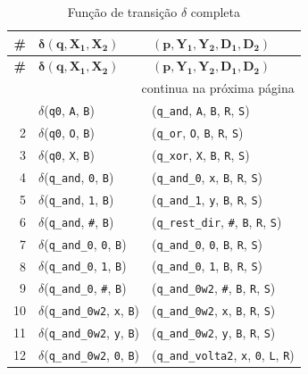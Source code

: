 \documentclass[report, 12pt]{uftreport}
\begin{document}
{\small
\begin{longtable}{r l l}
\caption{Função de transição $\delta$ completa}\label{tab:delta}\\
\toprule
\textbf{\#} & $\boldsymbol{\delta(q, X_1, X_2)}$ & $\boldsymbol{(p, Y_1, Y_2, D_1, D_2)}$ \\
\midrule
\endfirsthead
\toprule
\textbf{\#} & $\boldsymbol{\delta(q, X_1, X_2)}$ & $\boldsymbol{(p, Y_1, Y_2, D_1, D_2)}$ \\
\midrule
\endhead
\midrule
\multicolumn{3}{r}{\footnotesize continua na próxima página}\\
\endfoot
\bottomrule
\endlastfoot
1 & $\delta$(\texttt{q0}, \texttt{A}, \texttt{B}) & (\texttt{q\_and}, \texttt{A}, \texttt{B}, \texttt{R}, \texttt{S}) \\
2 & $\delta$(\texttt{q0}, \texttt{O}, \texttt{B}) & (\texttt{q\_or}, \texttt{O}, \texttt{B}, \texttt{R}, \texttt{S}) \\
3 & $\delta$(\texttt{q0}, \texttt{X}, \texttt{B}) & (\texttt{q\_xor}, \texttt{X}, \texttt{B}, \texttt{R}, \texttt{S}) \\
\midrule
4 & $\delta$(\texttt{q\_and}, \texttt{0}, \texttt{B}) & (\texttt{q\_and\_0}, \texttt{x}, \texttt{B}, \texttt{R}, \texttt{S}) \\
5 & $\delta$(\texttt{q\_and}, \texttt{1}, \texttt{B}) & (\texttt{q\_and\_1}, \texttt{y}, \texttt{B}, \texttt{R}, \texttt{S}) \\
6 & $\delta$(\texttt{q\_and}, \texttt{\#}, \texttt{B}) & (\texttt{q\_rest\_dir}, \texttt{\#}, \texttt{B}, \texttt{R}, \texttt{S}) \\
\midrule
7 & $\delta$(\texttt{q\_and\_0}, \texttt{0}, \texttt{B}) & (\texttt{q\_and\_0}, \texttt{0}, \texttt{B}, \texttt{R}, \texttt{S}) \\
8 & $\delta$(\texttt{q\_and\_0}, \texttt{1}, \texttt{B}) & (\texttt{q\_and\_0}, \texttt{1}, \texttt{B}, \texttt{R}, \texttt{S}) \\
9 & $\delta$(\texttt{q\_and\_0}, \texttt{\#}, \texttt{B}) & (\texttt{q\_and\_0w2}, \texttt{\#}, \texttt{B}, \texttt{R}, \texttt{S}) \\
\midrule
10 & $\delta$(\texttt{q\_and\_0w2}, \texttt{x}, \texttt{B}) & (\texttt{q\_and\_0w2}, \texttt{x}, \texttt{B}, \texttt{R}, \texttt{S}) \\
11 & $\delta$(\texttt{q\_and\_0w2}, \texttt{y}, \texttt{B}) & (\texttt{q\_and\_0w2}, \texttt{y}, \texttt{B}, \texttt{R}, \texttt{S}) \\
12 & $\delta$(\texttt{q\_and\_0w2}, \texttt{0}, \texttt{B}) & (\texttt{q\_and\_volta2}, \texttt{x}, \texttt{0}, \texttt{L}, \texttt{R}) \\

\end{longtable}}
\end{document}
